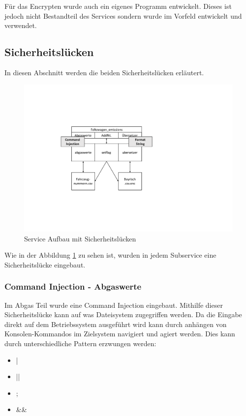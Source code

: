 Für das Encrypten wurde auch ein eigenes Programm entwickelt. Dieses ist jedoch nicht Bestandteil des Services sondern wurde im Vorfeld entwickelt und verwendet.

\subsection{Sicherheitslücken}
In diesen Abschnitt werden die beiden Sicherheitslücken erläutert. 

\begin{figure}[H]
\centering
\includegraphics[scale=1]{bilder/ictf/Aufbau_Service_Luecken.pdf}%
\caption{Service Aufbau mit Sicherheitslücken}%
\label{serviceAufbauLuecken}%
\end{figure}

Wie in der Abbildung \ref{serviceAufbauLuecken} zu sehen ist, wurden in jedem Subservice eine Sicherheitslücke eingebaut. 

\subsubsection{Command Injection - Abgaswerte}
Im Abgas Teil wurde eine Command Injection eingebaut. Mithilfe dieser Sicherheitslücke kann auf was Dateisystem zugegriffen werden.
Da die Eingabe direkt auf dem Betriebssystem ausgeführt wird kann durch anhängen von Konsolen-Kommandos im Zielsystem navigiert und agiert werden. 
Dies kann durch unterschiedliche Pattern erzwungen werden:
\begin{itemize}
\item |
\item || 
\item ; 
\item \&\& 
\end{itemize}


